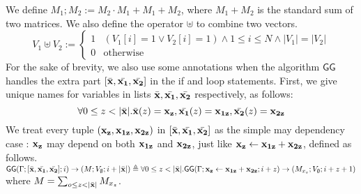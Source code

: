 We define $M_1 ; M_2  :=  M_2 \cdot M_1 + M_1 + M_2 $, where $M_1 + M_2$ is the standard sum of two matrices.
We also define the operator $\uplus$ to combine two vectors.
\[
V_1 \uplus V_2  :=  \left\{
\begin{array}{ll}
1 & (V_1[i] = 1 \lor V_2[i] = 1) \land 1 \leq i \leq N \land |V_1| = |V_2|\\
0 & \mbox{otherwise}
\end{array}\right.
\]
For the sake of brevity, we also use some annotations when the algorithm $\mathsf{GG}$ handles the extra part $[ \bar{{\bf{{x}}}}, \bar{{\bf{{x_1}}}},\bar{{\bf{{x_2}}}} ] $ in the if and loop statements. First, we give unique names for variables in lists $\bar{{\bf{{x}}}}, \bar{{\bf{{x_1}}}}, \bar{{\bf{{x_2}}}}$ respectively, as follows: \[ \forall 0 \leq z < |\bar{{\bf{{x}}}}|. \bar{{\bf{{x}}}}(z) = {\bf{{x_z}}}, \bar{{\bf{{x_1}}}}(z) = {\bf{{x_{1z}}}}, \bar{{\bf{{x_2}}}}(z) = {\bf{{x_{2z}}}} \]
We treat every tuple $({\bf{{x_z}}},{\bf{{x_{1z}}}},{\bf{{x_{2z}}}} )$ in $[\bar{{\bf{{x}}}}, \bar{{\bf{{x_1}}}}, \bar{{\bf{{x_2}}}} ]$ as the simple may dependency case : ${\bf{{x_z}}}$ may depend on both $ {\bf{{x_{1z}}}}$ and ${\bf{{x_{2z}}}}$, just like $ \mathrel{ {\bf{{x_z}}}  \leftarrow {\bf{{x_{1z}}}} + {\bf{{x_{2z}}}}  }$, defined as follows.\\ 
$
 \mathsf{GG}{(\Gamma; [\bar{{\bf{{x}}}}, \bar{{\bf{{x_1}}}}, \bar{{\bf{{x_2}}}} ] ; i )}\to {( M; V_{\emptyset}; i + |\bar{{\bf{{x}}}}| )} 
  \triangleq \\ { \forall 0 \leq z < |\bar{{\bf{{x}}}}|.
  \mathsf{GG}{(\Gamma;\mathrel{ {\bf{{x_z}}}  \leftarrow {\bf{{x_{1z}}}} + {\bf{{x_{2z}}}}  }; i+z )}\to {( M_{x_z};  V_{\emptyset}; i+z+1)} }$
   where $M = \sum_{o \leq z < |\bar{{\bf{{x}}}}| }M_{x_z} $.
%
